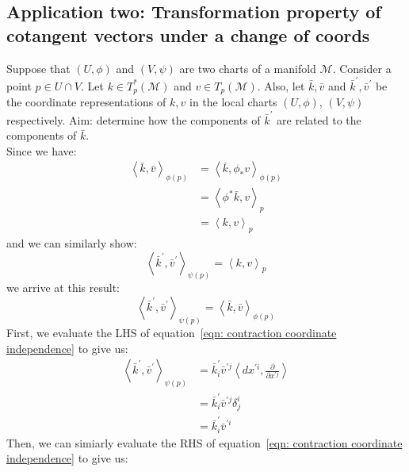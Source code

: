     \subsection{Application two: Transformation property of cotangent vectors under a change of coords}
      \label{subsec: transformation property of cotangent vectors under coord change}
      Suppose that $(U,\phi)$ and $(V,\psi)$ are two charts of a manifold
      $\mathcal{M}$. Consider a point $p \in U \cap V$. Let $k \in
      T^*_p(\mathcal{M})$ and $v \in T_p(\mathcal{M})$. Also, let $\bar{k},
      \bar{v}$ and $\bar{k}^\prime, \bar{v}^\prime$ be the coordinate
      representations of $k, v$ in the local charts $(U,\phi)$, $(V,\psi)$
      respectively. Aim: determine how the components of $\bar{k}^\prime$ are
      related to the components of $\bar{k}$.\\ Since we have:
      \begin{align*}
        \left\langle \bar{k}, \bar{v}\right\rangle_{\phi(p)}
        &= \left\langle \bar{k}, \phi_{*} v\right\rangle_{\phi(p)} \\
        &= \left\langle \phi^{*}\bar{k},  v\right\rangle_{p} \\
        &= \left\langle k,  v\right\rangle_{p}
      \end{align*}
      and we can similarly show:
        \[\left\langle \bar{k}^\prime, \bar{v}^\prime\right\rangle_{\psi(p)}
        = \left\langle k, v\right\rangle_{p}\]
      we arrive at this result:
        \begin{equation}
          \label{eqn: contraction coordinate independence}
          \left\langle \bar{k}^\prime, \bar{v}^\prime\right\rangle_{\psi(p)}
          = \left\langle \bar{k}, \bar{v}\right\rangle_{\phi(p)}
        \end{equation}
      First, we evaluate the LHS of equation~\ref{eqn: contraction coordinate
      independence} to give us:
      \begin{align}
        \left\langle \bar{k}^\prime, \bar{v}^\prime\right\rangle_{\psi(p)} 
        &= \bar{k}_{i}^{\prime} \bar{v}^{\prime j} \left\langle dx^{\prime i} ,
        \frac{\partial}{\partial x^{\prime j}} \right\rangle \nonumber \\
        &= \bar{k}_{i}^{\prime} \bar{v}^{\prime j} \delta^i_j \nonumber \\
        &= \bar{k}_{i}^{\prime} \bar{v}^{\prime i} \label{eqn:
        covector change of coord part 1}
      \end{align}
      Then, we can simiarly evaluate the RHS of equation~\ref{eqn: contraction coordinate independence} to give us:

